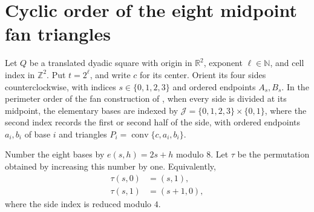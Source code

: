 \section{Cyclic order of the eight midpoint fan triangles}
\label{sec:area_law_cell_fan_cycle}

Let $Q$ be a translated dyadic square with origin in $\mathbb R^2$,
exponent $\ell\in\mathbb N$, and cell index in $\mathbb Z^2$. Put $t=2^\ell$, and write
$c$ for its center. Orient its four sides counterclockwise, with indices
$s\in\{0,1,2,3\}$ and ordered endpoints $A_s,B_s$.
In the perimeter order of the fan construction of
\cite[Section~11]{OpenAI2026AreaLaw}, when every side is divided at its
midpoint, the elementary bases are indexed by
$\mathcal J=\{0,1,2,3\}\times\{0,1\}$, where the second index records
the first or second half of the side, with ordered endpoints $a_i,b_i$ of
base $i$ and triangles $P_i=\operatorname{conv}\{c,a_i,b_i\}$.


\begin{definition}
    \label{def:area_law_cell_fan_successor}
    \leanok
    Number the eight bases by $e(s,h)=2s+h$ modulo $8$.
    Let $\tau$ be the permutation obtained by increasing this number
    by one. Equivalently,
    \begin{align}
        \tau(s,0) & =(s,1),   \\
        \tau(s,1) & =(s+1,0),
    \end{align}
    where the side index is reduced modulo $4$.
\end{definition}

